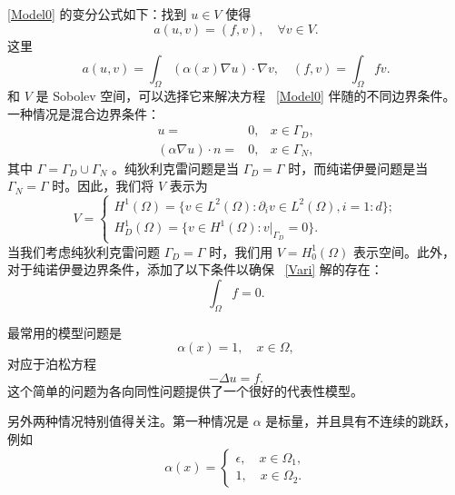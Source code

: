 \documentclass[12pt]{acta_2011xz}
\begin{document}
   \eqref{Model0}    的变分公式如下：找到
   $u\in V$    使得
   \begin{equation}
  \label{Vari}
a(u,v)=(f, v), \quad\forall v\in V.   
\end{equation}    这里
   $$
a(u,v)=\int_\Omega (\alpha(x)\nabla u)\cdot \nabla v, \quad 
(f,v)= \int_\Omega fv.
$$    和    $V$    是 Sobolev 空间，可以选择它来解决方程~    \eqref{Model0}    伴随的不同边界条件。一种情况是混合边界条件：
   \begin{equation}
  \label{MixedBoundary}
  \begin{array}{rcl}
u=&0, &x\in \Gamma_D, \\ 
(\alpha\nabla u)\cdot n=&0,&x \in\Gamma_N,
\end{array}
\end{equation}    其中
   $\Gamma=\Gamma_D\cup\Gamma_N$    。纯狄利克雷问题是当
   $\Gamma_D = \Gamma$    时，而纯诺伊曼问题是当    $\Gamma_N
=\Gamma$    时。因此，我们将    $V$    表示为
   \begin{equation}
  \label{3V}
V=
\left \{ 
  \begin{array}{l}
    H^1(\Omega) =  \{ v\in L^2(\Omega): \partial_iv\in    L^2(\Omega), i=1:d \} ; \\ 
    H^1_D(\Omega) =  \{ v\in H^1(\Omega): v|_{\Gamma_D}=0 \} . 
  \end{array}
\right.  
\end{equation}    当我们考虑纯狄利克雷问题    $\Gamma_D = \Gamma$    时，我们用    $V=H^1_0(\Omega)$    表示空间。此外，对于纯诺伊曼边界条件，添加了以下条件以确保~    \eqref{Vari}    解的存在：
   \begin{equation}
  \label{consistent-f}  \int_\Omega f =0. 
\end{equation}     

最常用的模型问题是 
   \begin{equation}
  \label{iso}
\alpha(x)=1, \quad x\in \Omega,
\end{equation}    对应于泊松方程
   \begin{equation}
  \label{Poisson}
-\Delta u=f.  
\end{equation}    这个简单的问题为各向同性问题提供了一个很好的代表性模型。  

另外两种情况特别值得关注。第一种情况是    $\alpha$    是标量，并且具有不连续的跳跃，例如
   \begin{equation}\label{coeff12}
\alpha(x) = \begin{cases}
\epsilon , \quad x\in \Omega_1, \\ 
1 , \quad x\in \Omega_2.
\end{cases}
\end{equation}     
\end{document}
